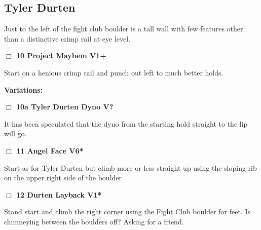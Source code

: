 \begin{multicols}{2}
\needspace{1.5cm}
\subsection*{Tyler Durten}\label{bf:Tyler Durten}
Just to the left of the fight club boulder is a tall wall with few features other than a distinctive crimp rail at eye level.\\
	


\needspace{1.5cm}
\label{rt:Project Mayhem}
\colorbox{green!20}{
\parbox{0.95\linewidth}{
\hspace{-1ex}\textbf{$\Box$
10 Project Mayhem V1+  
}}}
\begin{adjustwidth}{1.3em}{}			
Start on a henious crimp rail and punch out left to much better holds.
\end{adjustwidth}


\begin{adjustwidth}{0.5cm}{}				
\needspace{3cm}
\textbf{Variations:} \newline

\needspace{1.5cm}
\label{vr:Tyler Durten Dyno}
\colorbox{black!20}{
\parbox{0.95\linewidth}{
\hspace{-1ex}\textbf{$\Box$
10a Tyler Durten Dyno V?  
}}}
\begin{adjustwidth}{1.3em}{}			
It has been speculated that the dyno from the starting hold straight to the lip will go.
\end{adjustwidth}



\end{adjustwidth}


\needspace{1.5cm}
\label{rt:Angel Face}
\colorbox{RoyalBlue!20}{
\parbox{0.95\linewidth}{
\hspace{-1ex}\textbf{$\Box$
11 Angel Face V6*  
}}}
\begin{adjustwidth}{1.3em}{}			
Start as for Tyler Durten but climb more or less straight up using the sloping rib on the upper right side of the boulder
\end{adjustwidth}




\needspace{1.5cm}
\label{rt:Durten Layback}
\colorbox{green!20}{
\parbox{0.95\linewidth}{
\hspace{-1ex}\textbf{$\Box$
12 Durten Layback V1*  
}}}
\begin{adjustwidth}{1.3em}{}			
Stand start and climb the right corner using the Fight Club boulder for feet. Is chimneying between the boulders off? Asking for a friend.
\end{adjustwidth}






\end{multicols}
